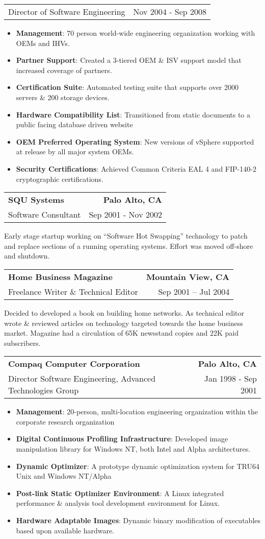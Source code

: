 \documentclass[letterpaper,11pt]{article}
\makeatletter
\newcommand{\resumeCompanyHeading}[4]{
  \vspace{-1pt}
    \item
    \begin{tabular*}{1.0\textwidth}[t]{l@{\extracolsep{\fill}}r}
      \textbf{#1} & \textbf{#2} \\
      {#3} & {#4}
    \end{tabular*}\vspace{-10pt}
  }
\newcommand{\resumeCompanyPositionHeading}[2]{
      \item
      \begin{tabular*}{1.0\textwidth}{l@{\extracolsep{\fill}}r}
        {#1} & {#2}
    \end{tabular*}\vspace{-10pt}
}
\newcommand{\resumeJobDescription}[1][]{
    \vspace{-1pt}\par{#1}
}
\newcommand{\resumeItem}[2]{\item{{\textbf{\small#1}}: {\small#2 \vspace{-1pt}}}}
\newcommand{\resumeItemListStart}{\begin{itemize}}
\newcommand{\resumeItemListEnd}{\end{itemize}}\vspace{-10pt}
\makeatother
\begin{document}
          \resumeCompanyPositionHeading 
          {Director of Software Engineering}
          {Nov 2004 - Sep 2008}
            \resumeItemListStart
                \resumeItem{Management}{70 person world-wide engineering organization working with OEMs and IHVs.}
                \resumeItem{Partner Support}{Created a 3-tiered OEM \& ISV support model that increased coverage of partners.}
                \resumeItem{Certification Suite}{Automated testing suite that supports over 2000 servers \& 200 storage devices.}
                \resumeItem{Hardware Compatibility List}{Transitioned from static documents to a public facing database driven website}
                \resumeItem{OEM Preferred Operating System}{New versions of vSphere supported at release by all major system OEMs.}
                \resumeItem{Security Certifications}{Achieved Common Criteria EAL 4 and FIP-140-2 cryptographic certifications.}
            \resumeItemListEnd
  
        \resumeCompanyHeading
            {SQU Systems}{Palo Alto, CA}
            {Software Consultant}{Sep 2001 - Nov 2002}
            \resumeJobDescription{
                Early stage startup working on “Software Hot Swapping” technology to patch and replace sections of a running operating
                systems.  Effort was moved off-shore and shutdown.}

        \resumeCompanyHeading
            {Home Business Magazine}{Mountain View, CA}
            {Freelance Writer \& Technical Editor} {Sep 2001 – Jul 2004}
            \resumeJobDescription {Decided to developed a book on building home networks. As technical editor wrote \& reviewed articles on technology targeted 
              towards the home business market. Magazine had a circulation of 65K newsstand copies and 22K paid subscribers.}

        \resumeCompanyHeading
            {Compaq Computer Corporation}{Palo Alto, CA}
            {Director Software Engineering, Advanced Technologies Group}{Jan 1998 - Sep 2001}
            \resumeItemListStart
                \resumeItem{Management}{20-person, multi-location engineering organization within the corporate research organization}
                \resumeItem{Digital Continuous Profiling Infrastructure}{Developed image manipulation library for Windows NT, both Intel and Alpha architectures.}
                \resumeItem{Dynamic Optimizer}{A prototype dynamic optimization system for TRU64 Unix and Windows NT/Alpha}
                \resumeItem{Post-link Static Optimizer Environment}{A Linux integrated performance \& analysis tool development environment for Linux.}
                \resumeItem{Hardware Adaptable Images}{Dynamic binary modification of executables based upon available hardware.}
            \resumeItemListEnd
\end{document}
